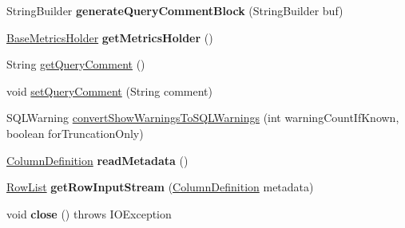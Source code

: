 \begin{DoxyCompactItemize}
String\+Builder {\bfseries generate\+Query\+Comment\+Block} (String\+Builder buf)
\item 
\mbox{\label{classcom_1_1mysql_1_1cj_1_1protocol_1_1a_1_1_native_protocol_a3f99cc50263379785978172b329dde39}} 
\mbox{\hyperlink{classcom_1_1mysql_1_1cj_1_1log_1_1_base_metrics_holder}{Base\+Metrics\+Holder}} {\bfseries get\+Metrics\+Holder} ()
\item 
String \mbox{\hyperlink{classcom_1_1mysql_1_1cj_1_1protocol_1_1a_1_1_native_protocol_a49cbec750255abc9a23f447effd70d1d}{get\+Query\+Comment}} ()
\item 
void \mbox{\hyperlink{classcom_1_1mysql_1_1cj_1_1protocol_1_1a_1_1_native_protocol_a31d74c4c65825a8c0b875831e4884f58}{set\+Query\+Comment}} (String comment)
\item 
S\+Q\+L\+Warning \mbox{\hyperlink{classcom_1_1mysql_1_1cj_1_1protocol_1_1a_1_1_native_protocol_ad6b7d57ce7e74e78055ed399bf79dc3b}{convert\+Show\+Warnings\+To\+S\+Q\+L\+Warnings}} (int warning\+Count\+If\+Known, boolean for\+Truncation\+Only)
\item 
\mbox{\label{classcom_1_1mysql_1_1cj_1_1protocol_1_1a_1_1_native_protocol_ade969eccfe66d5a42008c60897d118d7}} 
\mbox{\hyperlink{interfacecom_1_1mysql_1_1cj_1_1protocol_1_1_column_definition}{Column\+Definition}} {\bfseries read\+Metadata} ()
\item 
\mbox{\label{classcom_1_1mysql_1_1cj_1_1protocol_1_1a_1_1_native_protocol_a6bb695c2fd2b3492490208c56b23ebd4}} 
\mbox{\hyperlink{interfacecom_1_1mysql_1_1cj_1_1result_1_1_row_list}{Row\+List}} {\bfseries get\+Row\+Input\+Stream} (\mbox{\hyperlink{interfacecom_1_1mysql_1_1cj_1_1protocol_1_1_column_definition}{Column\+Definition}} metadata)
\item 
\mbox{\label{classcom_1_1mysql_1_1cj_1_1protocol_1_1a_1_1_native_protocol_a74b35f6ae7f3feb2baeee7a845c82085}} 
void {\bfseries close} ()  throws I\+O\+Exception 
\item 
\mbox{\label{classcom_1_1mysql_1_1cj_1_1protocol_1_1a_1_1_native_protocol_a0b65b9cd6aa03061e067e1d595d0ef39}} 

\end{DoxyCompactItemize}
